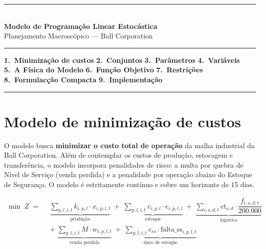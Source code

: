 \documentclass[12pt, a4paper]{article}
\begin{document}
\begin{center}
  {\color{ballblue}\rule{\linewidth}{2pt}}\\[8pt]
  {\LARGE\bfseries Modelo de Programa\c{c}\~{a}o Linear Estoc\'{a}stica}\\[4pt]
  {\large\color{darkgray} Planejamento Macrosc\'{o}pico --- Ball Corporation}\\[8pt]
  {\color{ballblue}\rule{\linewidth}{2pt}}
\end{center}

\vspace{10pt}
\begin{center}
  \small\color{darkgray}
  \textbf{1.~Minimiza\c{c}\~{a}o de custos}
  \enspace\textbullet\enspace
  \textbf{2.~Conjuntos}
  \enspace\textbullet\enspace
  \textbf{3.~Par\^{a}metros}
  \enspace\textbullet\enspace
  \textbf{4.~Vari\'{a}veis}
  \enspace\textbullet\enspace
  \textbf{5.~A F\'{i}sica do Modelo}
  \enspace\textbullet\enspace
  \textbf{6.~Fun\c{c}\~{a}o Objetivo}
  \enspace\textbullet\enspace
  \textbf{7.~Restri\c{c}\~{o}es}
  \enspace\textbullet\enspace
  \textbf{8.~Formulac\c{c}\~{a}o Compacta}
  \enspace\textbullet\enspace
  \textbf{9.~Implementa\c{c}\~{a}o}
\end{center}
\vspace{4pt}
{\color{accentgray}\rule{\linewidth}{0.5pt}}

\section{Modelo de minimiza\c{c}\~{a}o de custos}

O modelo busca \textbf{minimizar o custo total de opera\c{c}\~{a}o} da malha industrial da Ball
Corporation. Al\'{e}m de contemplar os custos de produ\c{c}\~{a}o, estocagem e transfer\^{e}ncia,
o modelo incorpora penalidades de risco: a multa por quebra de N\'{i}vel de Servi\c{c}o (venda perdida)
e a penalidade por opera\c{c}\~{a}o abaixo do Estoque de Seguran\c{c}a. O modelo \'{e} estritamente cont\'{i}nuo
e cobre um horizonte de 15 dias.

\[
  \boxed{
    \begin{aligned}
      \min \; Z \;=\;\;
      & \underbrace{\sum_{p,l,i,t} k_{i,p,l} \cdot x_{i,p,l,t}}_{\text{produ\c{c}\~{a}o}}
        \;+\;
        \underbrace{\sum_{p,l,i,t} v_{i,p,l} \cdot e_{i,p,l,t}}_{\text{estoque}} 
        \;+\;
        \underbrace{\sum_{i,o,d,t} ct_{o,d} \cdot \dfrac{f_{i,o,d,t}}{200{.}000}}_{\text{log\'{i}stica}}
      \\[12pt]
      & +\;
        \underbrace{\sum_{p,l,i,t} M \cdot w_{i,p,l,t}}_{\text{venda perdida}}
        \;+\;
        \underbrace{\sum_{p,l,i,t} c_{ss} \cdot \text{falta\_ss}_{i,p,l,t}}_{\text{risco de estoque}}
    \end{aligned}
  }
\]
\end{document}
